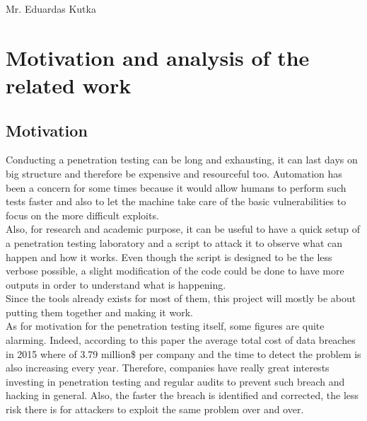 \documentclass[a4paper,12pt,fleqn]{article}
\begin{document}
 {}{}{}{}%
{Mr. Eduardas Kutka}

\tableofcontents


{}%





\newpage
\section{Motivation and analysis of the related work}
\label{sec:motivation}
\subsection{Motivation}
\label{sec:example}

Conducting a penetration testing can be long and exhausting, it can last days on big structure and therefore be expensive and resourceful too. Automation has been a concern for some times because it would allow humans to perform such tests faster and also to let the machine take care of the basic vulnerabilities to focus on the more difficult exploits. \\

Also, for research and academic purpose, it can be useful to have a quick setup of a penetration testing laboratory and a script to attack it to observe what can happen and how it works. Even though the script is designed to be the less verbose possible, a slight modification of the code could be done to have more outputs in order to understand what is happening. \\

Since the tools already exists for most of them, this project will mostly be about putting them together and making it work. \\

As for motivation for the penetration testing itself, some figures are quite alarming. Indeed, according to this paper\cite{motivation} the average total cost of data breaches in 2015 where of 3.79 million\$ per company and the time to detect the problem is also increasing every year. Therefore, companies have really great interests investing in penetration testing and regular audits to prevent such breach and hacking in general. Also, the faster the breach is identified and corrected, the less risk there is for attackers to exploit the same problem over and over.
\end{document}
